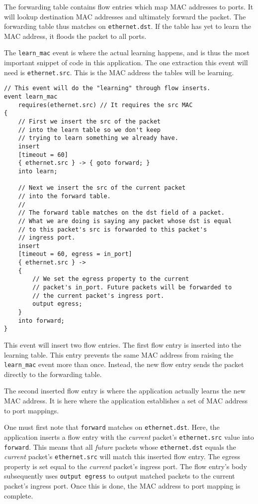 The forwarding table contains flow entries which map MAC addresses to ports. It will lookup destination MAC addresses and ultimately forward the packet. The forwarding table thus
matches on \texttt{ethernet.dst}. If the table has yet to learn the MAC address, it floods the packet to all ports.


The \texttt{learn\_mac} event is where the actual
learning happens, and is thus the most important snippet of code in this
application. The one extraction this event will need is \texttt{ethernet.src}.
This is the MAC address the tables will be learning.

\begin{codepage}
\begin{lstlisting}
// This event will do the "learning" through flow inserts.
event learn_mac
	requires(ethernet.src) // It requires the src MAC
{
	// First we insert the src of the packet
	// into the learn table so we don't keep
	// trying to learn something we already have.
	insert
	[timeout = 60]
	{ ethernet.src } -> { goto forward; }
	into learn;

	// Next we insert the src of the current packet
	// into the forward table.
	//
	// The forward table matches on the dst field of a packet.
	// What we are doing is saying any packet whose dst is equal
	// to this packet's src is forwarded to this packet's
	// ingress port.
	insert
	[timeout = 60, egress = in_port]
	{ ethernet.src } ->
	{
		// We set the egress property to the current
		// packet's in_port. Future packets will be forwarded to
		// the current packet's ingress port.
		output egress;
	}
	into forward;
}
\end{lstlisting}
\end{codepage}



This event will insert two flow entries. The first flow entry is inserted into
the learning table. This entry prevents the same MAC address from raising the
\texttt{learn\_mac} event more than once. Instead, the new flow entry sends the
packet directly to the forwarding table.

The second inserted flow entry is where the application actually learns the new MAC
address. It is here where the application establishes a set of MAC address to port mappings.

One must first note that \texttt{forward} matches on \texttt{ethernet.dst}. Here, the application inserts a
flow entry with the \textit{current} packet's \texttt{ethernet.src} value into
\texttt{forward}. This means that all \textit{future} packets whose
\texttt{ethernet.dst} equals the \textit{current} packet's \texttt{ethernet.src}
will match this inserted flow entry. The egress property is set equal to the
\textit{current} packet's ingress port. The flow entry's body subsequently uses
\texttt{output egress} to output matched packets to the current packet's ingress port. Once this is done, the MAC address to port mapping is complete.

